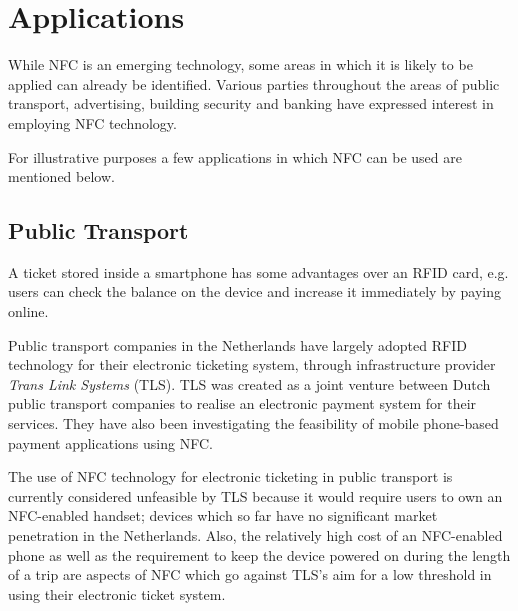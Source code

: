 \section{Applications}
\label{sec:applications}
While NFC is an emerging technology, some areas in which it is likely to be applied can already be identified.
Various parties throughout the areas of public transport, advertising, building security and banking have expressed interest in employing NFC technology.

For illustrative purposes a few applications in which NFC can be used are mentioned below.

\subsection{Public Transport}
A ticket stored inside a smartphone has some advantages over an RFID card, e.g. users can check the balance on the device and increase it immediately by paying online.

Public transport companies in the Netherlands have largely adopted RFID technology for their electronic ticketing system, through infrastructure provider \textit{Trans Link Systems} (TLS).
TLS was created as a joint venture between Dutch public transport companies to realise an electronic payment system for their services.
They have also been investigating the feasibility of mobile phone-based payment applications using NFC. \cite{cipit_artikel}

The use of NFC technology for electronic ticketing in public transport is currently considered unfeasible by TLS because it would require users to own an NFC-enabled handset; devices which so far have no significant market penetration in the Netherlands.
Also, the relatively high cost of an NFC-enabled phone as well as the requirement to keep the device powered on during the length of a trip are aspects of NFC which go against TLS's aim for a low threshold in using their electronic ticket system.

